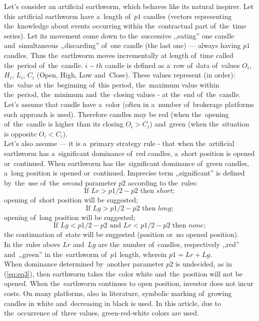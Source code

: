 \documentclass[runningheads,a4paper]{llncs}
\begin{document}
Let's consider an artificial earthworm, which behaves like its natural inspirer. Let this artificial earthworm have a~length of~$p1$ candles (vectors representing the~knowledge about events occurring within the~contractual part of~the~time series). Let its movement come down to the~successive ,,eating'' one candle and~simultaneous ,,discarding'' of~one candle (the last one) --- always having $p1$ candles. Thus the~earthworm moves incrementally at length of~time called the~period of~the~candle. $i-th$ candle is  defined as a~row of~data of~values  $O_i$, $H_i$, $L_i$, $C_i$ (Open, High, Low and~Close). These values represent (in order): the~value at the~beginning of~this period, the~maximum value within the~period, the~minimum and~the~closing values - at the~end of~the~candle.\\
Let's assume that candle have a~color (often in a~number of~brokerage platforms such approach is used). Therefore candles may be red (when the~opening of~the~candle is higher than its closing $O_i>C_i$) and~green (when the~situation is opposite $O_i<C_i$).\\
Let's also assume --- it is a~primary strategy rule - that when the~artificial earthworm has a~significant dominance of~red candles, a~short position is opened or~continued. When earthworm has the~significant dominance of~green candles, a~long position is opened or~continued. Imprecise term ,,significant'' is defined by~the~use of~the~second parameter $p2$ according to the~rules:
\begin{equation}
\text{If }  Lr > p1/2 -p2 \text{ then } short;
\end{equation}
opening of~short position will be suggested;
\begin{equation}
\text{If }  Lg > p1/2 -p2 \text{ then } long;
\end{equation}
opening of~long position will be suggested;
\begin{equation}
\text{If }  Lg < p1/2 -p2 \text{ and~} Lr< p1/2-p2 \text{ then } none;
\label{eq:eq3}
\end{equation}
the continuation of~state will be suggested (position or~no opened position).\\

In the~rules above $Lr$ and~$Lg$ are the~number of~candles, respectively ,,red'' and~,,green'' in the~earthworm of~$p1$ length, wherein $p1 = Lr + Lg$.\\
When dominance determined by~another parameter $p2$ is undecided, as in (\ref{eq:eq3}), then earthworm takes the~color white and~the~position will not be opened. When the~earthworm continues to open position, investor does not incur costs. On many platforms, also in literature, symbolic marking of~growing candles in white and~decreasing in black is used. In this article, due to the~occurrence of~three values, green-red-white colors are used.\\
\end{document}

